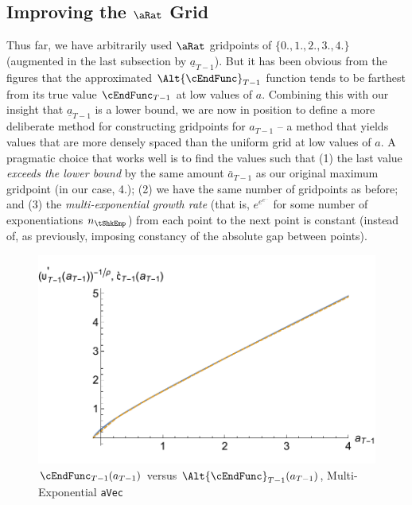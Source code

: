 \documentclass[titlepage]{\econtex}
\begin{document}

\hypertarget{Improving-the-a-Grid}{}
\subsection{Improving the $\aRat$ Grid}

Thus far, we have arbitrarily used $\aRat$ gridpoints of
$\{0.,1.,2.,3.,4.\}$ (augmented in the last subsection by
$\underline{a}_{T-1}$).  But it has been obvious from the figures that
the approximated $\Alt{\cEndFunc}_{T-1}$ function tends to be farthest from its true
value $\cEndFunc_{T-1}$ at low values of ${a}$.  Combining this with our insight that
$\underline{a}_{T-1}$ is a lower bound, we are now in position to
define a more deliberate method for constructing gridpoints for
${a}_{T-1}$ -- a method that yields values that are more densely
spaced than the uniform grid at low values of ${a}$.  A pragmatic
choice that works well is to find the values such that (1) the last
value \textit{exceeds the lower bound} by the same amount $\bar{a}_{T-1}$
as our original maximum gridpoint (in our case, 4.); (2) we have the
same number of gridpoints as before; and (3) the \textit{multi-exponential growth rate} (that is, $e^{e^{e^{...}}}$ for some
number of exponentiations $n_{\tShkEmp}$) from each point to the next point is
constant (instead of, as previously, imposing constancy of the
absolute gap between points).

\hypertarget{GothVInvVSGothCEEE}{}
\begin{figure}
  \includegraphics{./Figures/GothVInvVSGothCEEE}
  \caption{$\cEndFunc_{T-1}({a}_{T-1})$ versus
    $\Alt{\cEndFunc}_{T-1}({a}_{T-1})$, Multi-Exponential \texttt{aVec}}
  \label{fig:GothVInvVSGothCEE}
\end{figure}
\end{document}
